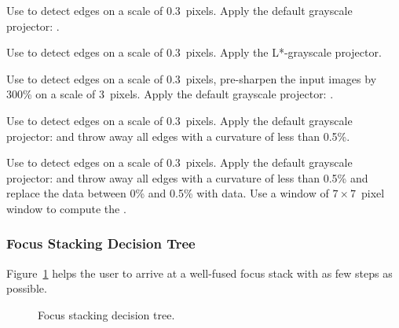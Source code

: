 \noindent{}

\begin{codelist}
\item[\option{--contrast-edge-scale=0.3}]\itemend Use  to
  detect edges on a scale of 0.3~pixels.  Apply the default grayscale
  projector: .

\item[\itempar{\option{--contrast-edge-scale=0.3}
    \option{--gray-projector=l-star}}]\itemend Use  to
  detect edges on a scale of 0.3~pixels.  Apply the L*-grayscale
  projector.

\item[\option{--contrast-edge-scale=0.3:3:300\%}]\itemend Use
   to detect edges on a scale of 0.3~pixels, pre-sharpen
  the input images by 300\% on a scale of 3~pixels.  Apply the default
  grayscale projector: .

\item[\itempar{\option{--contrast-edge-scale=0.3}
    \mbox{\option{--contrast-min-curvature=-0.5\%}}}]\itemend Use
   to detect edges on a scale of 0.3~pixels.  Apply the
  default grayscale projector:  and throw away all edges
  with a curvature of less than 0.5\%.

\item[\itempar{\mbox{\option{--contrast-edge-scale=0.3}}
    \mbox{\option{--contrast-min-curvature=0.5\%}}
    \mbox{\option{--contrast-window-size=7}}}]\itemend Use  to
  detect edges on a scale of 0.3~pixels.  Apply the default grayscale
  projector:  and throw away all edges with a curvature
  of less than 0.5\% and replace the  data between 0\%
  and 0.5\% with  data.  Use a window of $7 \times
  7$~pixel window to compute the .
\end{codelist}


\subsubsection[Focus Stacking Decision Tree]{Focus Stacking Decision Tree
  \label{sec:focus-stacking-decision-tree}
  }

Figure~\ref{fig:focus-stacking-decision-tree} helps the user to arrive
at a well-fused focus stack with as few steps as possible.

\begin{figure}[htbp]
  \begin{maxipage}
    \centering
  \end{maxipage}

  \caption{Focus stacking decision
    tree.\label{fig:focus-stacking-decision-tree}}
\end{figure}


